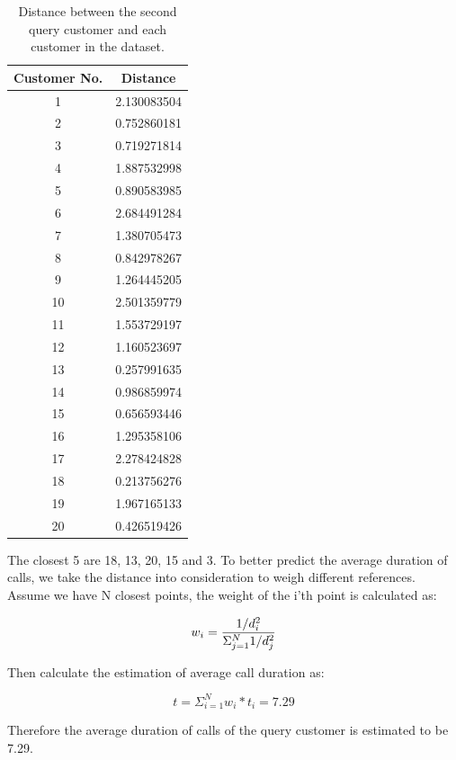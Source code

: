 \documentclass[12pt]{article}
\begin{document}
\begin{table}[!ht]
\footnotesize
\caption{Distance between the second query customer and each customer in the dataset.}
\begin{center}
\begin{tabular}{|c|c|}
\hline
Customer No. & Distance\\
\hline
1 & 2.130083504\\
2 & 0.752860181\\
3 & 0.719271814\\
4 & 1.887532998\\
5 & 0.890583985\\
6 & 2.684491284\\
7 & 1.380705473\\
8 & 0.842978267\\
9 & 1.264445205\\
10 & 2.501359779\\
11 &1.553729197\\
12 &1.160523697\\
13 & 0.257991635\\
14 & 0.986859974\\
15 & 0.656593446\\
16 & 1.295358106\\
17 & 2.278424828\\
18 & 0.213756276\\
19 & 1.967165133\\
20 & 0.426519426\\
\hline
\end{tabular}
\end{center}
\label{tab:dist2}
\end{table}%

The closest 5 are 18, 13, 20, 15 and 3. To better predict the average duration of calls, we take the distance into consideration to weigh different references. Assume we have N closest points, the weight of the i'th point is calculated as:

\begin{equation}
w_{i} = {1/d_{i}^{2}\over \Sigma_{j=1}^{N}{1/d_{j}^{2}}}
\end{equation}

Then calculate the estimation of average call duration as:

\begin{equation}
t = \Sigma_{i=1}^{N}{w_{i}*t_{i}} = 7.29
\end{equation}

Therefore the average duration of calls of the query customer is estimated to be 7.29.
\end{document}
